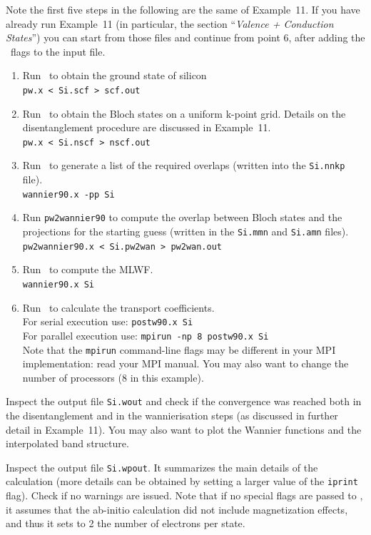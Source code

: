 \documentclass[a4paper,11pt,twoside]{article}
\begin{document}
Note the first five steps in the following are the same of Example~11.
If you have already run Example~11 (in particular, the section ``\emph{Valence + Conduction States}'')
you can start from those files and continue from point 6, after adding the \bw\ flags to the
input file.
\begin{enumerate}
\item Run \pwscf\ to obtain the ground state of silicon\\
{\tt pw.x < Si.scf > scf.out}

\item Run \pwscf\ to obtain the Bloch states on a uniform k-point
  grid. Details on the disentanglement procedure are discussed in Example~11.\\ 
{\tt pw.x < Si.nscf > nscf.out}

\item Run \wannier\ to generate a list of the required overlaps (written
  into the {\tt Si.nnkp} file).\\
{\tt wannier90.x -pp Si}

\item Run {\tt pw2wannier90} to compute the overlap between Bloch
  states and the projections for the starting guess (written in the
  {\tt Si.mmn} and {\tt  Si.amn} files).\\
{\tt pw2wannier90.x < Si.pw2wan > pw2wan.out}

\item Run \wannier\ to compute the MLWF.\\
{\tt wannier90.x Si}

\item Run \postw\ to calculate the transport coefficients.\\
For serial execution use: {\tt postw90.x Si}  \\
For parallel execution use: {\tt mpirun -np 8 postw90.x Si} \\
Note that the {\tt mpirun} command-line flags may be different in your MPI implementation: read your MPI manual. You may also want to change the number of processors (8 in this example).

\end{enumerate}

Inspect the output file {\tt Si.wout} and check if the convergence was reached both in the
disentanglement and in the wannierisation steps (as discussed in further detail in Example~11).
You may also want to plot the Wannier functions and the interpolated band structure.

Inspect the output file {\tt Si.wpout}. It summarizes the main details of the calculation (more details can be obtained by setting a larger value of the \verb#iprint# flag). 
Check if no warnings are issued. Note that if no special flags are passed to \bw, it assumes that
the ab-initio calculation did not include magnetization effects, and thus it sets to 2 the
number of electrons per state.
\end{document}
